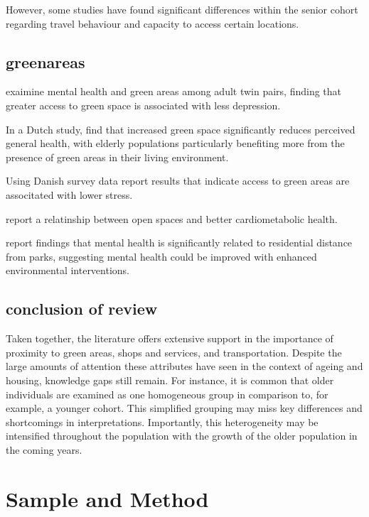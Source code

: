 \documentclass[3p,11pt ]{elsarticle}
\begin{document}
However, some studies have found significant differences within the senior cohort regarding travel behaviour and capacity to access certain locations.
\cite{hildebrandDimensionsElderlyTravel2003}
\cite{alsnihMobilityAccessibilityExpectations2003}


\subsection{greenareas}

\cite{cohen-clineAccessGreenSpace2015} exaimine mental health and green areas among adult twin pairs, finding that greater access to green space is associated with less depression.

In a Dutch study, \cite{maasGreenSpaceUrbanity2006} find that increased green space significantly reduces perceived general health, with elderly populations particularly benefiting more from the presence of green areas in their living environment.

Using Danish survey data\cite{nielsenGreenAreasAffect2007} report results that indicate access to green areas are associtated with lower stress.

\cite{paquetAreAccessibilityCharacteristics2013} report a relatinship between open spaces and better cardiometabolic health.


\cite{sturmProximityUrbanParks2014} report findings that mental health is significantly related to residential distance from parks, suggesting mental health could be improved with enhanced environmental interventions. 

\subsection{conclusion of review}
Taken together,
the literature offers extensive support in the importance of proximity to green areas, shops and services, and transportation.
Despite the large amounts of attention these attributes have seen in the context of ageing and housing,
knowledge gaps still remain.
For instance,
it is common that older individuals are examined as one homogeneous group in comparison to, for example, a younger cohort.
This simplified grouping may miss key differences and shortcomings in interpretations.
Importantly,
this heterogeneity may be intensified throughout the population with the growth of the older population in the coming years.


\section{Sample and Method}
\end{document}
